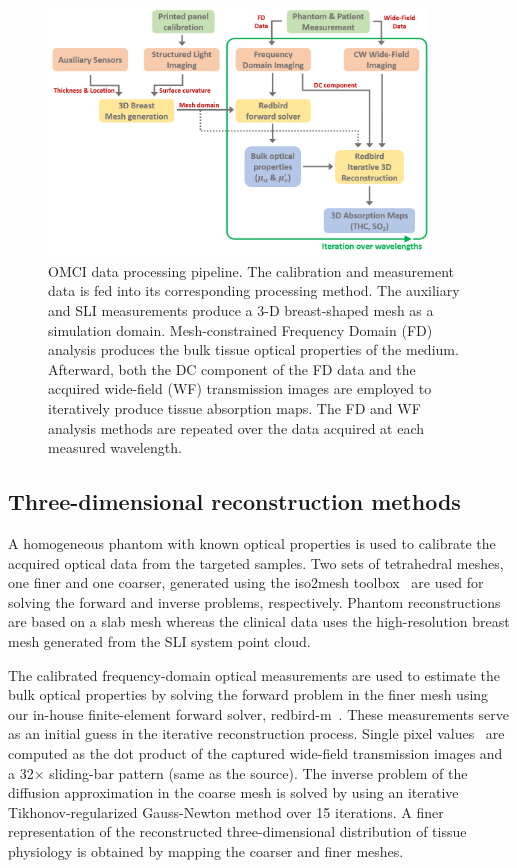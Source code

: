 \begin{figure}[]
\centering
\includegraphics[width=0.90\textwidth]{fig/omci/OMCIWorkflow_280720.png}
\caption{OMCI data processing pipeline. The calibration and measurement data is fed into its corresponding processing method. The auxiliary and SLI measurements produce a 3-D breast-shaped mesh as a simulation domain. Mesh-constrained Frequency Domain (FD) analysis produces the bulk tissue optical properties of the medium. Afterward, both the DC component of the FD data and the acquired wide-field (WF) transmission images are employed to iteratively produce tissue absorption maps. The FD and WF analysis methods are repeated over the data acquired at each measured wavelength.}
\label{fig:DataAnalysis}
\end{figure}


\subsection{Three-dimensional reconstruction methods}
\label{Sec:FDanalysis}
A homogeneous phantom with known optical properties is used to calibrate the acquired optical data from the targeted samples. Two sets of tetrahedral meshes, one finer and one coarser, generated using the iso2mesh toolbox~\cite{Fang2009} are used for solving the forward and inverse problems, respectively. Phantom reconstructions are based on a slab mesh whereas the clinical data uses the high-resolution breast mesh generated from the SLI system point cloud.

The calibrated frequency-domain optical measurements are used to estimate the bulk optical properties by solving the forward problem in the finer mesh using our in-house finite-element forward solver, redbird-m~\cite{Redbird2008}. These measurements serve as an initial guess in the iterative reconstruction process. Single pixel values~\cite{Yao2015} are computed as the dot product of the captured wide-field transmission images and a 32$\times$ sliding-bar pattern (same as the source). The inverse problem of the diffusion approximation in the coarse mesh is solved by using an iterative Tikhonov-regularized Gauss-Newton method over 15 iterations. A finer representation of the reconstructed three-dimensional distribution of tissue physiology is obtained by mapping the coarser and finer meshes.



